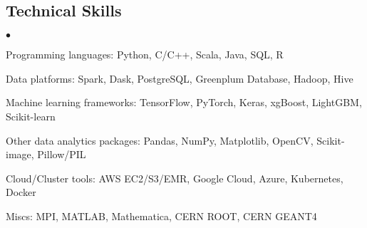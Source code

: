 \documentclass[margin,line]{res}
\newenvironment{list2}{
 \begin{list}{$\bullet$}{%
   \setlength{\itemsep}{0in}
   \setlength{\parsep}{0in} \setlength{\parskip}{0in}
   \setlength{\topsep}{0in} \setlength{\partopsep}{0in} 
   \setlength{\leftmargin}{0.2in}}}{\end{list}}
\begin{document}
\begin{resume}
\section{\sc Technical Skills} 
\begin{list2}
\item Programming languages: Python, C/C++, Scala, Java, SQL, R
\item Data platforms: Spark, Dask, PostgreSQL, Greenplum Database, Hadoop, Hive
\item Machine learning frameworks: TensorFlow, PyTorch, Keras, xgBoost, LightGBM, Scikit-learn
\item Other data analytics packages: Pandas, NumPy, Matplotlib, OpenCV, Scikit-image, Pillow/PIL
\item Cloud/Cluster tools: AWS EC2/S3/EMR, Google Cloud, Azure, Kubernetes, Docker
\item Miscs: MPI, MATLAB, Mathematica, CERN ROOT, CERN GEANT4\\ 
\end{list2}



\end{resume}
\end{document}
